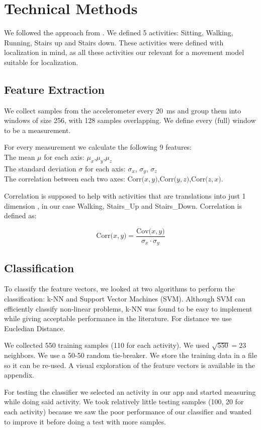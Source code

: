 \section{Technical Methods}
\label{sec:technical-methods}

We followed the approach from \cite{ravi2005activity}. We defined 5 activities: Sitting, Walking, Running, Stairs up and Stairs down. These activities were defined with localization in mind, as all these activities our relevant for a movement model suitable for localization.

\subsection{Feature Extraction}
\label{sec:feature-extraction}
We collect samples from the accelerometer every 20~ms and group them into windows of size 256, with 128 samples overlapping. We define every (full) window to be a measurement.

For every measurement we calculate the following 9 features: \\
The mean $\mu$ for each axis: $\mu_x$,$\mu_y$,$\mu_z$ \\
The standard deviation $\sigma$ for each axis: $\sigma_x$, $\sigma_y$, $\sigma_z$ \\
The correlation between each two axes:  $\text{Corr(}x,y{)}$,$\text{Corr(}y,z{)}$,$\text{Corr(}z,x{)}$.


Correlation is supposed to help with activities that are translations into just 1 dimension \cite{ravi2005activity}, in our case Walking, Stairs\_Up and Stairs\_Down.
Correlation is defined as:

\[
	\text{Corr(}x,y{)} = \frac{\text{Cov(}x,y{)}}{\sigma_x \cdot \sigma_y}
\]

\subsection{Classification}
\label{sec:classification}
To classify the feature vectors, we looked at two algorithms to perform the classification: k-NN and Support Vector Machines (SVM). Although SVM can efficiently classify non-linear problems, k-NN was found to be easy to implement while giving acceptable performance in the literature. For distance we use Eucledian Distance.

We collected 550 training samples (110 for each activity).
We used $\sqrt{550}=23$ neighbors.
We use a 50-50 random tie-breaker.
We store the training data in a file so it can be re-used.
A visual exploration of the feature vectors is available in the appendix.

For testing the classifier we selected an activity in our app and started measuring while doing said activity.
We took relatively little testing samples (100, 20 for each activity) because we saw the poor performance of our classifier and wanted to improve it before doing a test with more samples.

